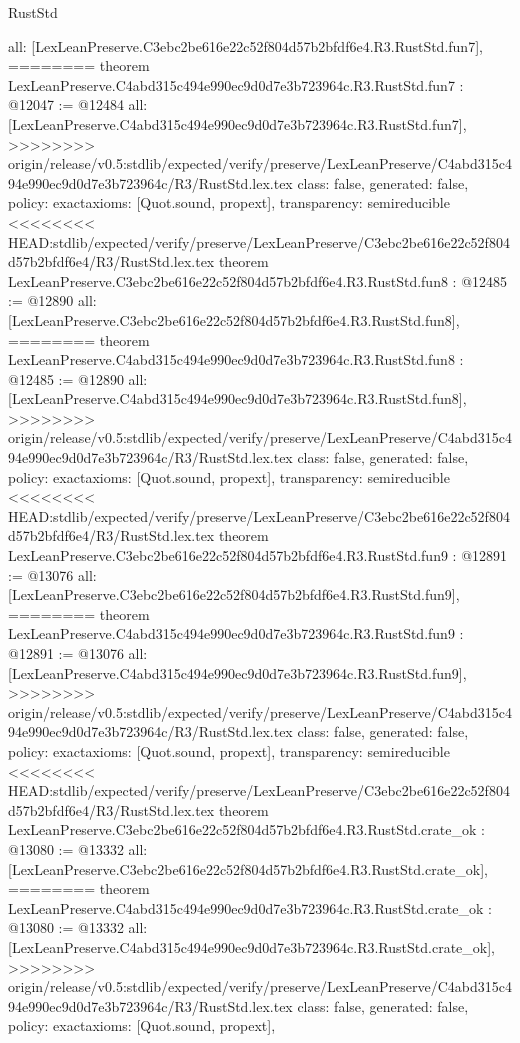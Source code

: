 \begin{lexlean}{RustStd}
\begin{coremodule}
{\begin{coremodule}
{{{{{{{{{{  all: [LexLeanPreserve.C3ebc2be616e22c52f804d57b2bfdf6e4.R3.RustStd.fun7],
========
theorem LexLeanPreserve.C4abd315c494e990ec9d0d7e3b723964c.R3.RustStd.fun7 : @12047 := @12484 {
  all: [LexLeanPreserve.C4abd315c494e990ec9d0d7e3b723964c.R3.RustStd.fun7],
>>>>>>>> origin/release/v0.5:stdlib/expected/verify/preserve/LexLeanPreserve/C4abd315c494e990ec9d0d7e3b723964c/R3/RustStd.lex.tex
  class: false,
  generated: false,
  policy: exact{axioms: [Quot.sound, propext]},
  transparency: semireducible
}
<<<<<<<< HEAD:stdlib/expected/verify/preserve/LexLeanPreserve/C3ebc2be616e22c52f804d57b2bfdf6e4/R3/RustStd.lex.tex
theorem LexLeanPreserve.C3ebc2be616e22c52f804d57b2bfdf6e4.R3.RustStd.fun8 : @12485 := @12890 {
  all: [LexLeanPreserve.C3ebc2be616e22c52f804d57b2bfdf6e4.R3.RustStd.fun8],
========
theorem LexLeanPreserve.C4abd315c494e990ec9d0d7e3b723964c.R3.RustStd.fun8 : @12485 := @12890 {
  all: [LexLeanPreserve.C4abd315c494e990ec9d0d7e3b723964c.R3.RustStd.fun8],
>>>>>>>> origin/release/v0.5:stdlib/expected/verify/preserve/LexLeanPreserve/C4abd315c494e990ec9d0d7e3b723964c/R3/RustStd.lex.tex
  class: false,
  generated: false,
  policy: exact{axioms: [Quot.sound, propext]},
  transparency: semireducible
}
<<<<<<<< HEAD:stdlib/expected/verify/preserve/LexLeanPreserve/C3ebc2be616e22c52f804d57b2bfdf6e4/R3/RustStd.lex.tex
theorem LexLeanPreserve.C3ebc2be616e22c52f804d57b2bfdf6e4.R3.RustStd.fun9 : @12891 := @13076 {
  all: [LexLeanPreserve.C3ebc2be616e22c52f804d57b2bfdf6e4.R3.RustStd.fun9],
========
theorem LexLeanPreserve.C4abd315c494e990ec9d0d7e3b723964c.R3.RustStd.fun9 : @12891 := @13076 {
  all: [LexLeanPreserve.C4abd315c494e990ec9d0d7e3b723964c.R3.RustStd.fun9],
>>>>>>>> origin/release/v0.5:stdlib/expected/verify/preserve/LexLeanPreserve/C4abd315c494e990ec9d0d7e3b723964c/R3/RustStd.lex.tex
  class: false,
  generated: false,
  policy: exact{axioms: [Quot.sound, propext]},
  transparency: semireducible
}
<<<<<<<< HEAD:stdlib/expected/verify/preserve/LexLeanPreserve/C3ebc2be616e22c52f804d57b2bfdf6e4/R3/RustStd.lex.tex
theorem LexLeanPreserve.C3ebc2be616e22c52f804d57b2bfdf6e4.R3.RustStd.crate_ok : @13080 := @13332 {
  all: [LexLeanPreserve.C3ebc2be616e22c52f804d57b2bfdf6e4.R3.RustStd.crate_ok],
========
theorem LexLeanPreserve.C4abd315c494e990ec9d0d7e3b723964c.R3.RustStd.crate_ok : @13080 := @13332 {
  all: [LexLeanPreserve.C4abd315c494e990ec9d0d7e3b723964c.R3.RustStd.crate_ok],
>>>>>>>> origin/release/v0.5:stdlib/expected/verify/preserve/LexLeanPreserve/C4abd315c494e990ec9d0d7e3b723964c/R3/RustStd.lex.tex
  class: false,
  generated: false,
  policy: exact{axioms: [Quot.sound, propext]},
}}}}}}}}}}}}}}
\end{coremodule}}
\end{coremodule}
\end{lexlean}
